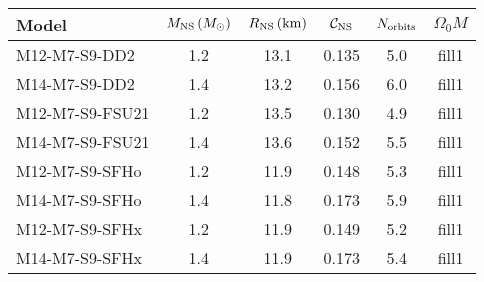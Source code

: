 \begin{tabular}{|l||ccccc|}
	\hline
	Model & $M_{\rm NS}\,(M_\odot)$ & $R_{\rm NS}\,({\rm km})$ & $\cal{C}_{\rm NS}$ & $N_{\rm orbits}$ & $\Omega_0 M$ \\
	\hline%
	M12-M7-S9-DD2 & 1.2 & 13.1 & 0.135 & 5.0 & fill1\\
	M14-M7-S9-DD2 & 1.4 & 13.2 & 0.156 & 6.0 & fill1\\
	M12-M7-S9-FSU21 & 1.2 & 13.5 & 0.130 & 4.9 & fill1\\
	M14-M7-S9-FSU21 & 1.4 & 13.6 & 0.152 & 5.5 & fill1\\
	M12-M7-S9-SFHo & 1.2 & 11.9 & 0.148 & 5.3 & fill1\\
	M14-M7-S9-SFHo & 1.4 & 11.8 & 0.173 & 5.9 & fill1\\
	M12-M7-S9-SFHx & 1.2 & 11.9 & 0.149 & 5.2 & fill1\\
	M14-M7-S9-SFHx & 1.4 & 11.9 & 0.173 & 5.4 & fill1\\
	\hline
\end{tabular}